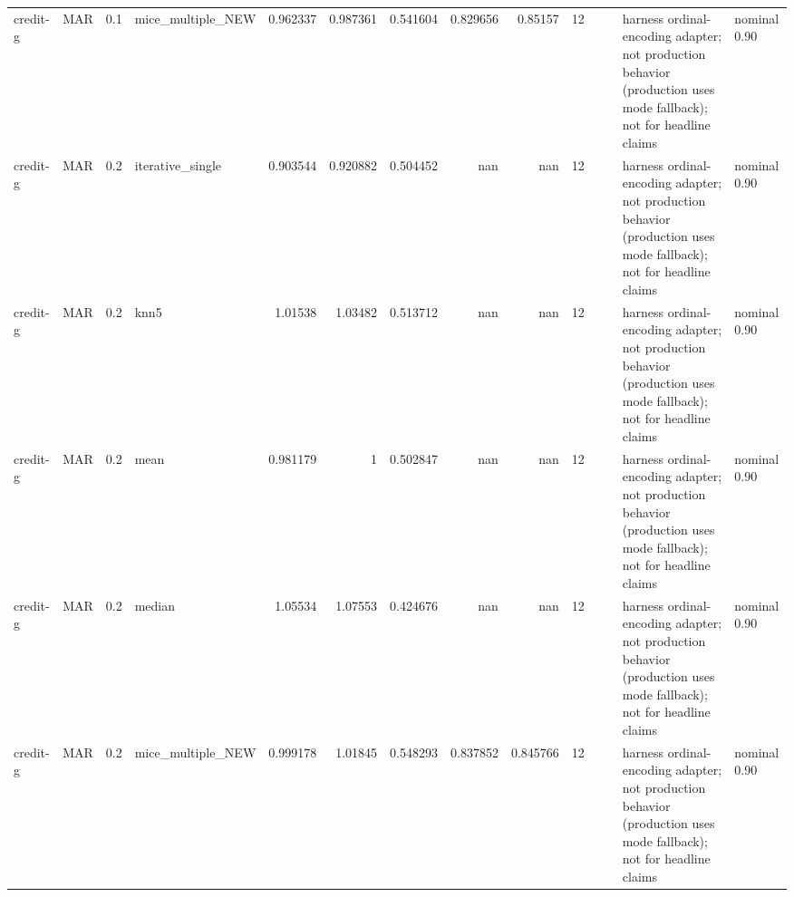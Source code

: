 \begin{table}[ht]
\begin{tabular}{llrlrrrrrrllll}
 credit-g             & MAR         &         0.1 & mice\_multiple\_NEW &       0.962337 &             0.987361 &                 0.541604 &                       0.829656 &                         0.85157  &        12 &                    &                                         & harness ordinal-encoding adapter; not production behavior (production uses mode fallback); not for headline claims & nominal 0.90              \\
 credit-g             & MAR         &         0.2 & iterative\_single  &       0.903544 &             0.920882 &                 0.504452 &                     nan        &                       nan        &        12 &                    &                                         & harness ordinal-encoding adapter; not production behavior (production uses mode fallback); not for headline claims & nominal 0.90              \\
 credit-g             & MAR         &         0.2 & knn5              &       1.01538  &             1.03482  &                 0.513712 &                     nan        &                       nan        &        12 &                    &                                         & harness ordinal-encoding adapter; not production behavior (production uses mode fallback); not for headline claims & nominal 0.90              \\
 credit-g             & MAR         &         0.2 & mean              &       0.981179 &             1        &                 0.502847 &                     nan        &                       nan        &        12 &                    &                                         & harness ordinal-encoding adapter; not production behavior (production uses mode fallback); not for headline claims & nominal 0.90              \\
 credit-g             & MAR         &         0.2 & median            &       1.05534  &             1.07553  &                 0.424676 &                     nan        &                       nan        &        12 &                    &                                         & harness ordinal-encoding adapter; not production behavior (production uses mode fallback); not for headline claims & nominal 0.90              \\
 credit-g             & MAR         &         0.2 & mice\_multiple\_NEW &       0.999178 &             1.01845  &                 0.548293 &                       0.837852 &                         0.845766 &        12 &                    &                                         & harness ordinal-encoding adapter; not production behavior (production uses mode fallback); not for headline claims & nominal 0.90              \\

\end{tabular}
\end{table}
